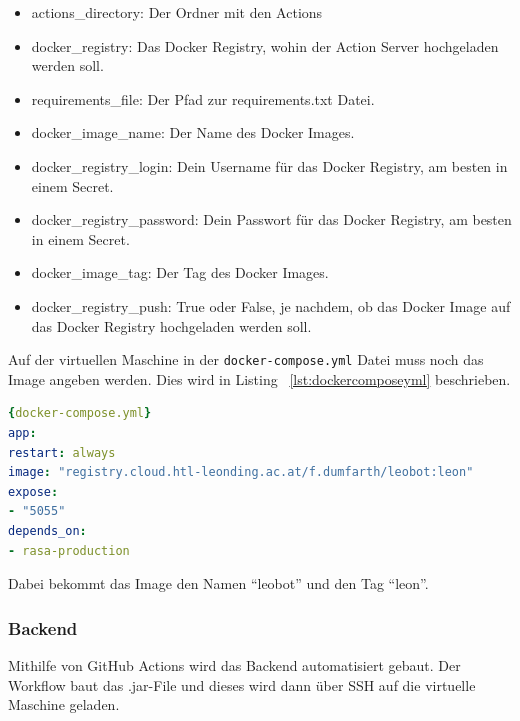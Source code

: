\begin{itemize}
    \item actions\_directory: Der Ordner mit den Actions
    \item docker\_registry: Das Docker Registry, wohin der Action Server hochgeladen werden soll.
    \item requirements\_file: Der Pfad zur requirements.txt Datei.
    \item docker\_image\_name: Der Name des Docker Images.
    \item docker\_registry\_login: Dein Username für das Docker Registry, am besten in einem Secret.
    \item docker\_registry\_password: Dein Passwort für das Docker Registry, am besten in einem Secret.
    \item docker\_image\_tag: Der Tag des Docker Images.
    \item docker\_registry\_push: True oder False, je nachdem, ob das Docker Image auf das Docker Registry hochgeladen werden soll.
\end{itemize}

Auf der virtuellen Maschine in der \texttt{docker-compose.yml} Datei muss noch das Image angeben werden.
Dies wird in Listing ~\ref{lst:dockercomposeyml} beschrieben.

\begin{lstlisting}[language=yaml,label={lst:dockercomposeyml},caption={docker-compose.yml}]{docker-compose.yml}
app:
restart: always
image: "registry.cloud.htl-leonding.ac.at/f.dumfarth/leobot:leon"
expose:
- "5055"
depends_on:
- rasa-production
\end{lstlisting}

Dabei bekommt das Image den Namen ``leobot'' und den Tag ``leon''.

\subsubsection{Backend}
Mithilfe von GitHub Actions wird das Backend automatisiert gebaut.
Der Workflow baut das .jar-File und dieses wird dann über SSH auf die virtuelle Maschine geladen.

